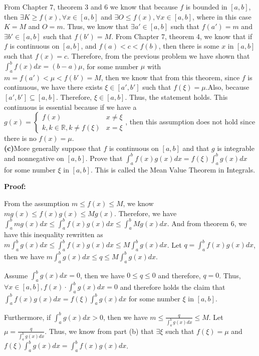 \documentclass[a4paper,12pt]{report}
\begin{document}
\noindent
From Chapter 7, theorem 3 and 6 we know that because $f$ is bounded in $[a,b]$, then $\exists K\geq f(x), \forall x \in [a,b]$ and $\exists O\leq f(x), \forall x \in [a,b]$, where in this case $K= M$ and $O=m$. Thus, we know that $\exists a' \in [a,b]$ such that $f(a')=m$ and $\exists b' \in [a,b]$ such that $f(b')=M$. From Chapter 7, theorem 4, we know that if $f$ is continuous on $[a,b]$, and $f(a)<c<f(b)$, then there is some $x$ in $[a,b]$ such that $f(x) = c$. Therefore, from the previous problem we have shown that $\int_a^bf(x)dx=(b-a)\mu$, for some number $\mu$ with $m=f(a')<\mu<f(b')=M$, then we know that from this theorem, since $f$ is continuous, we have there exists $\xi \in [a',b']$ such that $f(\xi )=\mu$.Also, because $[a',b']\subseteq [a,b]$. Therefore, $\xi \in [a,b]$. Thus, the statement holds.
This continuous is essential because if we have a $g(x)=
\begin{cases}
f(x) & x\neq \xi\\
k, k\in \mathbb{R}, k\neq f(\xi) &x=\xi
\end{cases}$, then this assumption does not hold since there is no $f(x)=\mu$. 
\\

\noindent
\textbf{(c)}More generally suppose that $f$ is continuous on $[a,b]$ and that $g$ is integrable and nonnegative on $[a,b]$. Prove that $\int_a^bf(x)g(x)dx=f(\xi)\int_a^bg(x)dx$ for some number $\xi$ in $[a,b]$. This is called the Mean Value Theorem in Integrals. 

\noindent
\textbf{Proof: }

\noindent
From the assumption $m\leq f(x)\leq M$, we know $mg(x)\leq f(x)g(x)\leq Mg(x)$. Therefore, we have $\int_a^bmg(x)dx\leq  \int_a^bf(x)g(x)dx \leq \int_a^bMg(x)dx$. And from theorem 6, we have this inequality rewritten as $m\int_a^bg(x)dx\leq  \int_a^bf(x)g(x)dx \leq M\int_a^bg(x)dx$. Let $q =\int_a^bf(x)g(x)dx$, then we have $m\int_a^bg(x)dx\leq  q \leq M\int_a^bg(x)dx$.

\noindent
Assume $\int_a^bg(x)dx=0$, then we have $0\leq q\leq 0$ and therefore, $q =0$. Thus, $\forall x \in [a,b], f(x)\cdot\int_a^bg(x)dx=0$ and therefore holds the claim that $\int_a^bf(x)g(x)dx=f(\xi)\int_a^bg(x)dx$ for some number $\xi$ in $[a,b]$.

\noindent
Furthermore, if $\int_a^bg(x)dx>0$, then we have $m\leq \frac{q}{\int_a^bg(x)dx}\leq M$. Let $\mu = \frac{q}{\int_a^bg(x)dx}$. Thus, we know from part (b) that $\exists \xi$ such that $f(\xi)=\mu$ and $f(\xi)\int_a^bg(x)dx=\int_a^bf(x)g(x)dx$.\\
\end{document}

